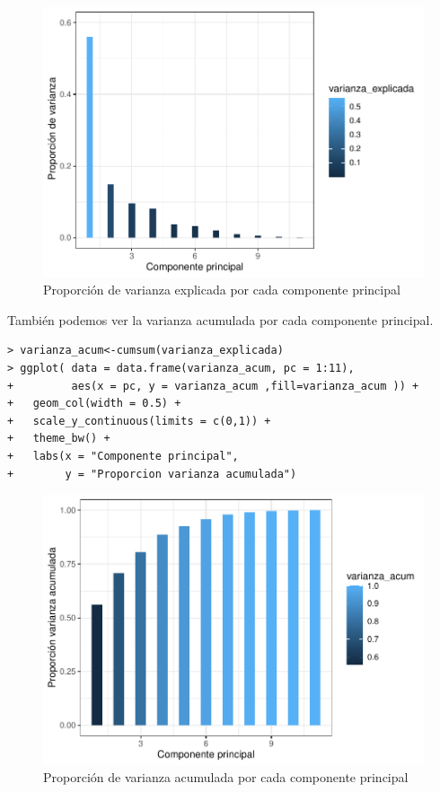 \documentclass[12pt,twoside]{report}
\begin{document}
\begin{figure}[H]
\includegraphics[width=\textwidth]{../code/figures/proporcion_varianza.pdf}
\caption{Proporción de varianza explicada por cada componente principal}
\label{fig:proporcion_varianza}
\end{figure} 

También podemos ver la varianza acumulada por cada componente principal.

\begin{lstlisting}
> varianza_acum<-cumsum(varianza_explicada)
> ggplot( data = data.frame(varianza_acum, pc = 1:11),
+         aes(x = pc, y = varianza_acum ,fill=varianza_acum )) +
+   geom_col(width = 0.5) +
+   scale_y_continuous(limits = c(0,1)) +
+   theme_bw() +
+   labs(x = "Componente principal",
+        y = "Proporcion varianza acumulada")
\end{lstlisting}


\begin{figure}[H]
\includegraphics[width=\textwidth]{../code/figures/varianza_acumulada.pdf}
\caption{Proporción de varianza acumulada por cada componente principal}
\label{fig:varianza_acumulada}
\end{figure} 
\end{document}
